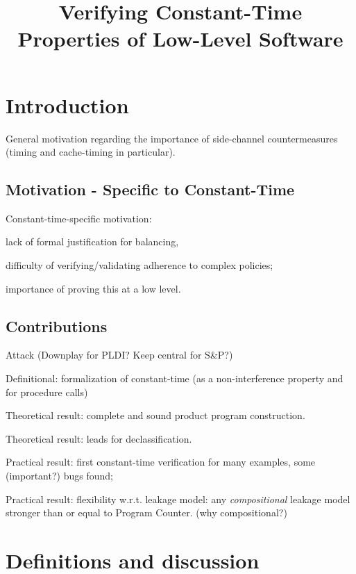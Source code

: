 \documentclass[letterpaper,10pt]{IEEEtran} %
\title{Verifying Constant-Time Properties of Low-Level Software}
\begin{document}
\maketitle

\section{Introduction}

General motivation regarding the importance of side-channel
countermeasures (timing and cache-timing in particular).

\subsection{Motivation - Specific to Constant-Time}
Constant-time-specific motivation:
\begin{compactitem}
\item lack of formal justification for balancing,
\item difficulty of verifying/validating adherence to complex
  policies;
\item importance of proving this at a low level.
\end{compactitem}

\subsection{Contributions}
\begin{compactitem}
\item Attack (Downplay for PLDI? Keep central for S\&P?)
\item Definitional: formalization of constant-time (as a non-interference 
property and for procedure calls)
\item Theoretical result: complete and sound product program
  construction.
\item Theoretical result: leads for declassification.
\item Practical result: first constant-time verification for many
  examples, some (important?) bugs found;
\item Practical result: flexibility w.r.t. leakage model: any
  \emph{compositional} leakage model stronger than or equal to Program
  Counter. (why compositional?)
\end{compactitem}

\section{Definitions and discussion}
\end{document}
